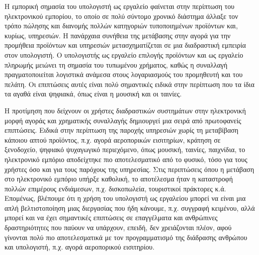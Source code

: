 \documentclass[
]{article}
\begin{document}
Η εμπορική σημασία του υπολογιστή ως εργαλείο φαίνεται στην περίπτωση
του ηλεκτρονικού εμπορίου, το οποίο σε πολύ σύντομο χρονικό διάστημα
άλλαξε τον τρόπο πώλησης και διανομής πολλών κατηγοριών τυποποιημένων
προϊόντων και, κυρίως, υπηρεσιών. Η πανάρχαια συνήθεια της μετάβασης
στην αγορά για την προμήθεια προϊόντων και υπηρεσιών μετασχηματίζεται σε
μια διαδραστική εμπειρία στον υπολογιστή. Ο υπολογιστής ως εργαλείο
επιλογής προϊόντων και ως εργαλείο πληρωμής μειώνει τη σημασία του
τυπωμένου χρήματος, καθώς η συναλλαγή πραγματοποιείται λογιστικά ανάμεσα
στους λογαριασμούς του προμηθευτή και του πελάτη. Οι επιπτώσεις αυτές
είναι πολύ σημαντικές ειδικά στην περίπτωση που τα ίδια τα αγαθά είναι
ψηφιακά, όπως είναι η μουσική και οι ταινίες.

Η προτίμηση που δείχνουν οι χρήστες διαδραστικών συστημάτων στην
ηλεκτρονική μορφή αγοράς και χρηματικής συναλλαγής δημιουργεί μια σειρά
από πρωτοφανείς επιπτώσεις. Ειδικά στην περίπτωση της παροχής υπηρεσιών
χωρίς τη μεταβίβαση κάποιου απτού προϊόντος, π.χ. αγορά αεροπορικών
εισιτηρίων, κράτηση σε ξενοδοχείο, ψηφιακό ψυχαγωγικό περιεχόμενο, όπως
μουσική, ταινίες, παιχνίδια, το ηλεκτρονικό εμπόριο αποδείχτηκε πιο
αποτελεσματικό από το φυσικό, τόσο για τους χρήστες όσο και για τους
παρόχους της υπηρεσίας. Στις περιπτώσεις όπου η μετάβαση στο ηλεκτρονικό
εμπόριο υπήρξε καθολική, το αποτέλεσμα ήταν η καταστροφή πολλών
επιμέρους ενδιάμεσων, π.χ. δισκοπωλεία, τουριστικοί πράκτορες κ.ά.
Επομένως, βλέπουμε ότι η χρήση του υπολογιστή ως εργαλείου μπορεί να
είναι μια απλή βελτιστοποίηση μιας διεργασίας που ήδη κάνουμε, π.χ.
συγγραφή κειμένου, αλλά μπορεί και να έχει σημαντικές επιπτώσεις σε
επαγγέλματα και ανθρώπινες δραστηριότητες που παύουν να υπάρχουν,
επειδή, δεν χρειάζονται πλέον, αφού γίνονται πολύ πιο αποτελεσματικά με
τον προγραμματισμό της διάδρασης ανθρώπου και υπολογιστή, π.χ. αγορά
αεροπορικού εισιτηρίου.
\end{document}
